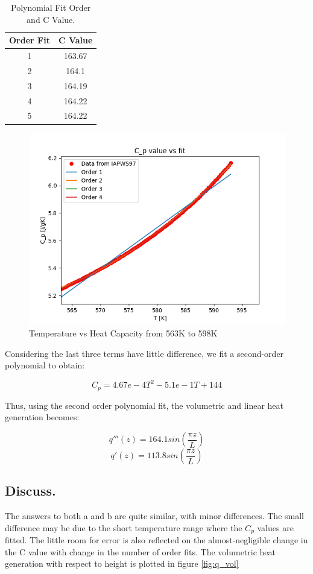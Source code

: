 \documentclass[12pt,letterpaper]{article}
\begin{document}
\begin{table}[h]
     \centering
    \begin{tabular}{cc}
       \hline
       Order Fit & C Value  \\
       \hline
       1 & 163.67 \\
       2 & 164.1 \\
       3 & 164.19 \\
       4 & 164.22 \\
       5 & 164.22 \\
       \hline
    \end{tabular}
    \caption {Polynomial Fit Order and C Value.}
    \label{tab:poly_fit}
\end{table}


\begin{figure}[htbp!]
    \begin{center}
        \includegraphics[scale=0.7]{cp_plot.png}
    \end{center}
    \caption{Temperature vs Heat Capacity from 563K to 598K}
    \label{fig:poly_fit}
\end{figure}


Considering the last three terms have little difference, we 
fit a second-order polynomial to obtain:

\[C_p = 4.67e-4T^2 -5.1e-1T + 144\]

Thus, using the second order polynomial fit, the volumetric
and linear heat generation becomes:

\[q'''(z) = 164.1 sin(\frac{\pi z}{L})\]
\[q'(z) = 113.8 sin(\frac{\pi z}{L})\]


\subsection*{Discuss.}
The answers to both a and b are quite similar, with minor differences.
The small difference may be due to the short temperature range where
the $C_p$ values are fitted. The little room for error is also reflected
on the almost-negligible change in the C value with change in the number of 
order fits. The volumetric heat generation with respect to height is plotted in
figure \ref{fig:q_vol}
\end{document}
